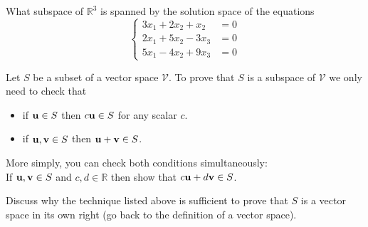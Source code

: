 \begin{problem}
What subspace of $\mathbb{R}^3$ is spanned by the solution space of the equations
    \[ \left\{ \begin{array}{rl} 3x_1 + 2x_2 + x_2 &= 0 \\
            2x_1 +5x_2 - 3x_3 &= 0 \\
        5x_1-4x_2 +9x_3 &= 0 \end{array} \right. \]
\end{problem}


   \begin{thm}\label{thm:prove_subspace}
       Let $S$ be a subset of a vector space $\mathcal{V}$.  To prove that $S$ is a
       subspace of $\mathcal{V}$ we only need to check that 
       \begin{itemize}
           \item if ${\bf u} \in S$ then $c{\bf u} \in S$ for any scalar $c$.
           \item if ${\bf u}, {\bf v} \in S$ then ${\bf u} + {\bf v} \in S$.
       \end{itemize}
       More simply, you can check both conditions simultaneously:\\
       If ${\bf u},{\bf v}\in S$ and $c,d \in \mathbb{R}$ then show that $c{\bf u} + d{\bf v} \in S$.
   \end{thm}

   \begin{problem}
       Discuss why the technique listed above is sufficient to prove that $S$ is a vector
       space in its own right (go back to the definition of a vector space).
   \end{problem}


